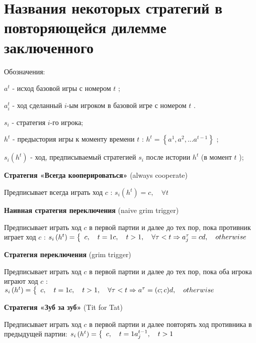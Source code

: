\documentclass[12pt, a4paper]{article}
\theoremstyle{exersize}
\numberwithin{problem}{section}
\begin{document}
\section{Названия некоторых стратегий в повторяющейся дилемме заключенного}

Обозначения:

 $a^{t} $  - исход базовой игры с номером  $t$ ;

 $a_{i}^{t} $  - ход сделанный  $i$-ым игроком в базовой игре с номером  $t$ .

 $s_{i} $  - стратегия  $i$-го игрока;

 $h^{t} $  - предыстория игры к моменту времени  $t$ :  $h^{t} =\left\{a^{1} ,a^{2} ,...a^{t-1} \right\}$ ;

 $s_{i} \left(h^{t} \right)$  - ход, предписываемый стратегией  $s_{i} $  после истории  $h^{t} $  (в момент  $t$ );

{\bf Стратегия «Всегда кооперироваться»} (always cooperate)

Предписывает всегда играть ход  $c$ :  $s_{i} \left(h^{t} \right)=c,\quad \forall t$

{\bf Наивная стратегия переключения} (naive grim trigger)

Предписывает играть ход  $c$  в первой партии и далее до тех пор, пока противник играет ход  $c$ :  $s_{i} \left(h^{t} \right)=\left\{\begin{array}{l} {c,\quad t=1} \par {c,\quad t>1,\quad \forall \tau <t\Rightarrow a_{j}^{\tau } =c} \par {d,\quad otherwise} \end{array}\right. $

{\bf Стратегия переключения} (grim trigger)

Предписывает играть ход  $c$  в первой партии и далее до тех пор, пока оба игрока играют ход  $c$ :  $s_{i} \left(h^{t} \right)=\left\{\begin{array}{l} {c,\quad t=1} \par {c,\quad t>1,\quad \forall \tau <t\Rightarrow a^{\tau } =\left(c;c\right)} \par {d,\quad otherwise} \end{array}\right. $

{\bf Стратегия «Зуб за зуб»} (Tit for Tat)

Предписывает играть ход  $c$  в первой партии и далее повторять ход противника в предыдущей партии:  $s_{i} \left(h^{t} \right)=\left\{\begin{array}{l} {c,\quad t=1} \par {a_{j}^{t-1} ,\quad t>1} \end{array}\right. $
\end{document}
